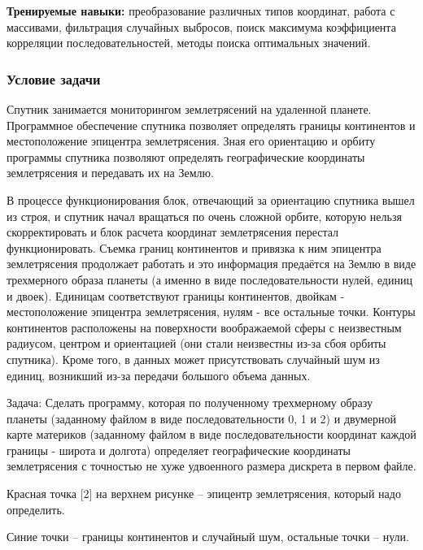 
\textbf{Тренируемые навыки: } преобразование различных типов координат, работа с массивами, фильтрация случайных выбросов, поиск максимума коэффициента корреляции последовательностей, методы поиска оптимальных значений.

\subsubsection*{Условие задачи}

Спутник занимается мониторингом землетрясений на удаленной планете. Программное обеспечение спутника позволяет определять границы континентов и местоположение эпицентра землетрясения. Зная его ориентацию и орбиту программы спутника позволяют определять географические координаты землетрясения и передавать их на Землю.

В процессе функционирования блок, отвечающий за ориентацию спутника вышел из строя, и спутник начал вращаться по очень сложной орбите, которую нельзя скорректировать и блок расчета координат землетрясения перестал функционировать. Съемка границ континентов и привязка к ним эпицентра землетрясения продолжает работать и это информация предаётся на Землю в виде трехмерного образа планеты (а именно в виде последовательности нулей, единиц и двоек). Единицам соответствуют границы континентов, двойкам - местоположение эпицентра землетрясения, нулям - все остальные точки. Контуры континентов расположены на поверхности воображаемой сферы с неизвестным радиусом, центром и ориентацией (они стали неизвестны из-за сбоя орбиты спутника). Кроме того, в данных может присутствовать случайный шум из единиц, возникший из-за передачи большого объема данных.

Задача: Сделать программу, которая по полученному трехмерному образу планеты (заданному файлом в виде последовательности 0, 1 и 2) и двумерной карте материков (заданному файлом в виде последовательности координат каждой границы - широта и долгота) определяет географические координаты землетрясения с точностью не хуже удвоенного размера дискрета в первом файле.

\explaneSection


Красная точка [2] на верхнем рисунке -- эпицентр землетрясения, который надо определить.

Синие точки -- границы континентов и случайный шум, остальные точки -- нули.

